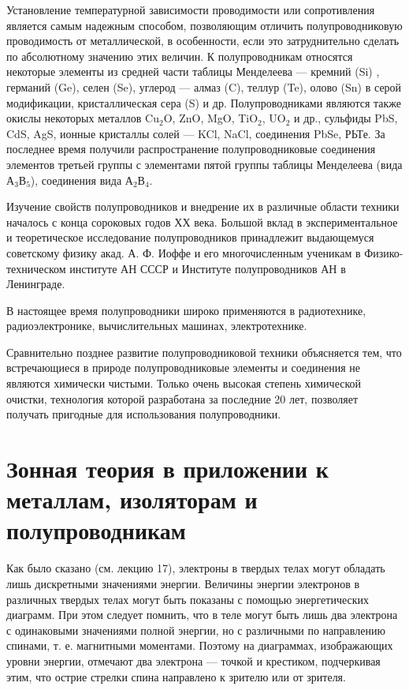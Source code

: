 \documentclass[a4paper,10pt]{book}
\begin{document}
Установление температурной зависимости проводимости или сопротивления является самым надежным способом, позволяющим отличить полупроводниковую проводимость от металлической, в особенности, если это затруднительно сделать по абсолютному значению этих величин. К полупроводникам относятся некоторые элементы из средней части таблицы Менделеева — кремний (Si) , германий (Ge), селен (Se), углерод — алмаз (C), теллур (Te), олово (Sn) в серой модификации, кристаллическая сера (S) и др. Полупроводниками являются также окислы некоторых металлов  Cu$_2$O, ZnO, MgO, TiO$_2$, UO$_2$ и др., сульфиды PbS, CdS, AgS, ионные  кристаллы солей — KCl, NaCl, соединения PbSe, РЬТе. За последнее время получили распространение полупроводниковые соединения элементов третьей группы с элементами пятой группы таблицы Менделеева (вида А$_3$В$_5$), соединения вида А$_2$В$_4$.

Изучение свойств полупроводников и внедрение их в различные области техники началось с конца сороковых годов ХХ века. Большой вклад в экспериментальное и теоретическое исследование полупроводников принадлежит выдающемуся советскому физику акад. А. Ф. Иоффе и его многочисленным ученикам в Физико-техническом институте АН СССР и Институте полупроводников АН в Ленинграде.

В настоящее время полупроводники широко применяются в радиотехнике, радиоэлектронике, вычислительных машинах, электротехнике.

Сравнительно позднее развитие полупроводниковой техники объясняется тем, что встречающиеся в природе полупроводниковые элементы и соединения не являются химически чистыми. Только очень высокая степень химической очистки, технология которой разработана за последние 20 лет, позволяет получать пригодные для использования полупроводники.

\section{Зонная теория в приложении к металлам, изоляторам и полупроводникам}

Как было сказано (см. лекцию 17), электроны в твердых телах могут обладать лишь дискретными значениями энергии. Величины энергии электронов в различных твердых телах могут быть показаны с помощью энергетических диаграмм. При этом следует помнить, что в теле могут быть лишь два электрона с одинаковыми значениями полной энергии, но с различными по направлению спинами, т. е. магнитными моментами. Поэтому на диаграммах, изображающих уровни энергии, отмечают два электрона — точкой и крестиком, подчеркивая этим, что острие стрелки спина направлено к зрителю или от зрителя.
\end{document}

